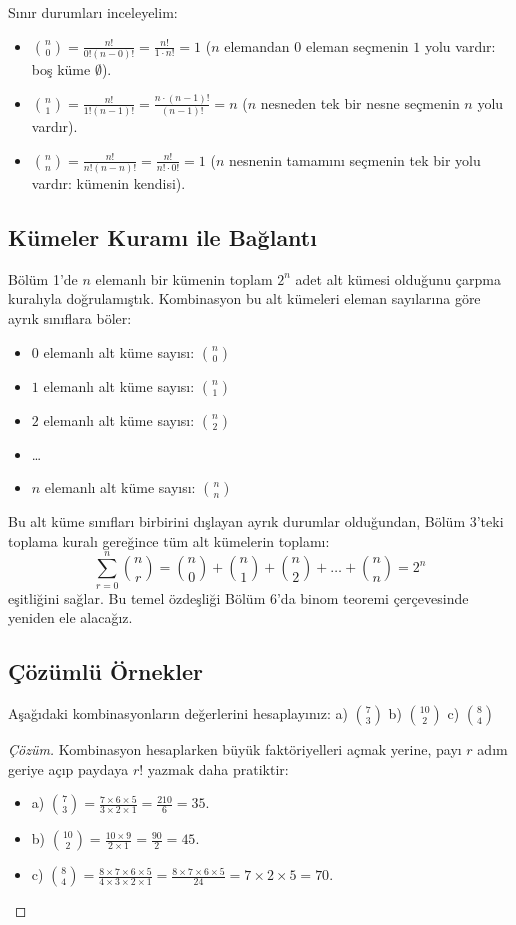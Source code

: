 Sınır durumları inceleyelim:
\begin{itemize}
  \item $\binom{n}{0} = \frac{n!}{0!(n-0)!} = \frac{n!}{1 \cdot n!} = 1$ ($n$ elemandan $0$ eleman seçmenin $1$ yolu vardır: boş küme $\emptyset$).
  \item $\binom{n}{1} = \frac{n!}{1!(n-1)!} = \frac{n \cdot (n-1)!}{(n-1)!} = n$ ($n$ nesneden tek bir nesne seçmenin $n$ yolu vardır).
  \item $\binom{n}{n} = \frac{n!}{n!(n-n)!} = \frac{n!}{n! \cdot 0!} = 1$ ($n$ nesnenin tamamını seçmenin tek bir yolu vardır: kümenin kendisi).
\end{itemize}

\subsection{Kümeler Kuramı ile Bağlantı}

Bölüm 1'de $n$ elemanlı bir kümenin toplam $2^n$ adet alt kümesi olduğunu çarpma kuralıyla doğrulamıştık. Kombinasyon bu alt kümeleri eleman sayılarına göre ayrık sınıflara böler:
\begin{itemize}
  \item $0$ elemanlı alt küme sayısı: $\binom{n}{0}$
  \item $1$ elemanlı alt küme sayısı: $\binom{n}{1}$
  \item $2$ elemanlı alt küme sayısı: $\binom{n}{2}$
  \item \dots
  \item $n$ elemanlı alt küme sayısı: $\binom{n}{n}$
\end{itemize}
Bu alt küme sınıfları birbirini dışlayan ayrık durumlar olduğundan, Bölüm 3'teki toplama kuralı gereğince tüm alt kümelerin toplamı:
\[ \sum_{r=0}^n \binom{n}{r} = \binom{n}{0} + \binom{n}{1} + \binom{n}{2} + \dots + \binom{n}{n} = 2^n \]
eşitliğini sağlar. Bu temel özdeşliği Bölüm 6'da binom teoremi çerçevesinde yeniden ele alacağız.

\subsection{Çözümlü Örnekler}

\begin{example}
Aşağıdaki kombinasyonların değerlerini hesaplayınız:
a) $\binom{7}{3}$ \quad b) $\binom{10}{2}$ \quad c) $\binom{8}{4}$
\end{example}
\begin{proof}[Çözüm]
Kombinasyon hesaplarken büyük faktöriyelleri açmak yerine, payı $r$ adım geriye açıp paydaya $r!$ yazmak daha pratiktir:
\begin{itemize}
  \item a) $\binom{7}{3} = \frac{7 \times 6 \times 5}{3 \times 2 \times 1} = \frac{210}{6} = 35$.
  \item b) $\binom{10}{2} = \frac{10 \times 9}{2 \times 1} = \frac{90}{2} = 45$.
  \item c) $\binom{8}{4} = \frac{8 \times 7 \times 6 \times 5}{4 \times 3 \times 2 \times 1} = \frac{8 \times 7 \times 6 \times 5}{24} = 7 \times 2 \times 5 = 70$.
\end{itemize}
\end{proof}

